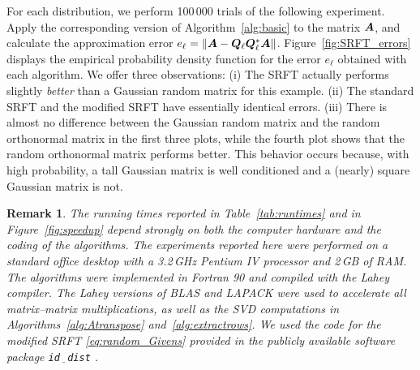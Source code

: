 \documentclass[final]{siamltex}
\newcounter{algorithm}[section]
\newcommand{\pgnotate}[1]{{\color{blue}[#1]}}
\newtheorem{remark}{Remark}[section]
\begin{document}
For each distribution, we perform 100\,000 trials of the following experiment.
Apply the corresponding version of Algorithm~\ref{alg:basic} to the matrix $\bm{A}$,
and calculate the approximation error $e_{\ell} = \left\Vert {\bm{A} - \bm{Q}_{\ell}\bm{Q}_{\ell}^{*}\bm{A}} \right\Vert$.
Figure~\ref{fig:SRFT_errors} displays the empirical probability density function for the error $e_{\ell}$
obtained with each algorithm.  We offer three observations:
(i) The SRFT actually performs slightly \textit{better} than a Gaussian random matrix for
this example.
(ii) The standard SRFT and the modified SRFT have essentially identical errors.
(iii) There is almost no difference between the Gaussian random
matrix and the random orthonormal matrix in the first three plots,
while the fourth plot shows that the random orthonormal matrix performs better.
This behavior occurs because, with high probability, a tall Gaussian matrix
is well conditioned and a (nearly) square Gaussian matrix is not.

\lsp

\begin{remark} \label{rem:fortran} \rm
The running times reported in Table~\ref{tab:runtimes} and in Figure~\ref{fig:speedup} depend
strongly on both the computer hardware and the coding of the algorithms.  The experiments
reported here were performed on a standard office desktop with a 3.2\,GHz Pentium IV processor and  2\,GB of RAM.
The algorithms were implemented in Fortran 90 and compiled with the Lahey compiler. The Lahey versions
of BLAS and LAPACK were used to accelerate all matrix--matrix multiplications, as well as the SVD computations in
Algorithms~\ref{alg:Atranspose} and~\ref{alg:extractrows}.  We used the code for the modified SRFT
\eqref{eq:random_Givens} provided in the publicly available software package \texttt{id$\underline{\mbox{ }}$dist} \cite{id_dist}.
\end{remark}
\end{document}
